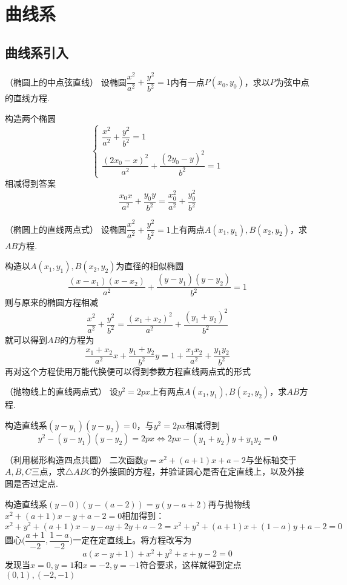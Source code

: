 \chapter{曲线系}
\section{曲线系引入}
\begin{example}{（椭圆上的中点弦直线）}{}
设椭圆$\dfrac{x^2}{a^2}+\dfrac{y^2}{b^2}=1$内有一点$P(x_0,y_0)$，求以$P$为弦中点的直线方程.
\end{example}
\begin{solution}
    构造两个椭圆\[\begin{cases}\dfrac{x^2}{a^2}+\dfrac{y^2}{b^2}=1\\\dfrac{(2x_0-x)^2}{a^2}+\dfrac{(2y_0-y)^2}{b^2}=1\end{cases}\]
    相减得到答案\[\dfrac{x_0x}{a^2}+\dfrac{y_0y}{b^2}=\dfrac{x_0^2}{a^2}+\dfrac{y_0^2}{b^2}\]
\end{solution}
\begin{example}{（椭圆上的直线两点式）}{}
设椭圆$\dfrac{x^2}{a^2}+\dfrac{y^2}{b^2}=1$上有两点$A(x_1,y_1),B(x_2,y_2)$，求$AB$方程.
\end{example}
\begin{solution}
    构造以$A(x_1,y_1),B(x_2,y_2)$为直径的相似椭圆\[\dfrac{(x-x_1)(x-x_2)}{a^2}+\dfrac{(y-y_1)(y-y_2)}{b^2}=1\]则与原来的椭圆方程相减
    \[\dfrac{x^2}{a^2}+\dfrac{y^2}{b^2}=\dfrac{(x_1+x_2)^2}{a^2}+\dfrac{(y_1+y_2)^2}{b^2}\]就可以得到$AB$的方程为
    \[\dfrac{x_1+x_2}{a^2}x+\dfrac{y_1+y_2}{b^2}y=1+\dfrac{x_1x_2}{a^2}+\dfrac{y_1y_2}{b^2}\]
    再对这个方程使用万能代换便可以得到参数方程直线两点式的形式
\end{solution}
\begin{example}{（抛物线上的直线两点式）}{}
设$y^2=2px$上有两点$A(x_1,y_1),B(x_2,y_2)$，求$AB$方程.
\end{example}
\begin{solution}
    构造直线系$(y-y_1)(y-y_2)=0$，与$y^2=2px$相减得到\[y^2-(y-y_1)(y-y_2)=2px\Leftrightarrow 2px-(y_1+y_2)y+y_1y_2=0\]
\end{solution}
\begin{example}{（利用梯形构造四点共圆）}{}
    二次函数$y=x^2+(a+1)x+a-2$与坐标轴交于$A,B,C$三点，求$\triangle ABC$的外接圆的方程，并验证圆心是否在定直线上，以及外接圆是否过定点.
\end{example}
\begin{solution}
    构造直线系$(y-0)(y-(a-2))=y(y-a+2)$再与抛物线$x^2+(a+1)x-y+a-2=0$相加得到：
    \[x^2+y^2+(a+1)x-y-ay+2y+a-2=x^2+y^2+(a+1)x+(1-a)y+a-2=0\]
    圆心$\bigg(\dfrac{a+1}{-2},\dfrac{1-a}{-2}\bigg)$一定在定直线上。将方程改写为
    \[a(x-y+1)+x^2+y^2+x+y-2=0\]发现当$x=0,y=1$和$x=-2,y=-1$符合要求，这样就得到定点$(0,1),(-2,-1)$
\end{solution}
